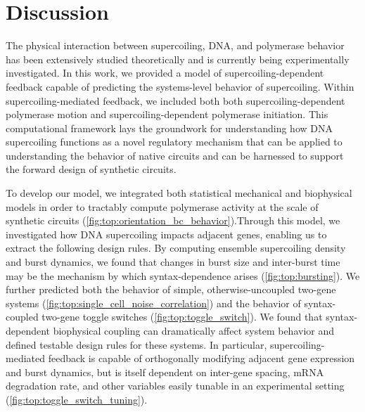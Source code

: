 \documentclass[11pt]{article}
\begin{document}
\FloatBarrier
\section{Discussion}
The physical interaction between supercoiling, DNA, and polymerase behavior has been extensively studied theoretically and is currently being experimentally investigated. 
In this work, we provided a model of supercoiling-dependent feedback capable of predicting the systems-level behavior of supercoiling. Within supercoiling-mediated feedback, we included both both supercoiling-dependent polymerase motion and supercoiling-dependent polymerase initiation. This computational framework lays the groundwork for understanding how DNA supercoiling functions as a novel regulatory mechanism that can be applied to understanding the behavior of native circuits and can be harnessed to support the forward design of synthetic circuits. %

To develop our model, we integrated both statistical mechanical and biophysical models in order to tractably compute polymerase activity at the scale of synthetic circuits  (\cref{fig:top:orientation_bc_behavior}).Through this model, we investigated how DNA supercoiling impacts adjacent genes, enabling us to extract the following design rules. %
By computing ensemble supercoiling density and burst dynamics, we found that changes in burst size and inter-burst time may be the mechanism by which syntax-dependence arises (\cref{fig:top:bursting}). We further predicted both the behavior of simple, otherwise-uncoupled two-gene systems (\cref{fig:top:single_cell_noise_correlation}) and the behavior of syntax-coupled two-gene toggle switches (\cref{fig:top:toggle_switch}). We found that syntax-dependent biophysical coupling can dramatically affect system behavior and defined testable design rules for these systems. In particular, supercoiling-mediated feedback is capable of orthogonally modifying adjacent gene expression and burst dynamics, but is itself dependent on inter-gene spacing, mRNA degradation rate, and other variables easily tunable in an experimental setting (\cref{fig:top:toggle_switch_tuning}).
\end{document}
